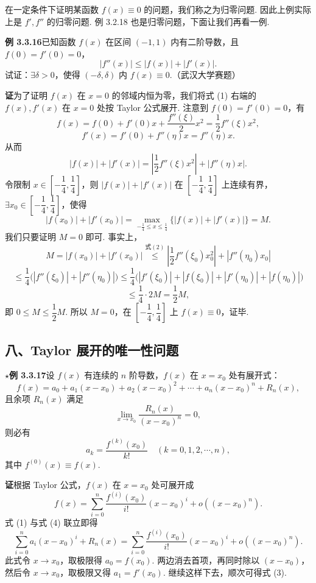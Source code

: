 \documentclass[UTF8,12pt,a4paper,fontset=fandol]{ctexart}
\begin{document}
在一定条件下证明某函数 $f(x)\equiv0$ 的问题，我们称之为归零问题. 因此上例实际上是 $f',f''$ 的归零问题. 例 3.2.18 也是归零问题，下面让我们再看一例.

\noindent\textbf{例 3.3.16}\quad 已知函数 $f(x)$ 在区间 $(-1,1)$ 内有二阶导数，且 $f(0)=f'(0)=0$，
\[
  |f''(x)|\le |f(x)|+|f'(x)|. \tag{1}
\]
试证：$\exists\delta>0$，使得 $(-\delta,\delta)$ 内 $f(x)\equiv0$.（武汉大学赛题）

\noindent\textbf{证}\quad 为了证明 $f(x)$ 在 $x=0$ 的邻域内恒为零，我们将式 (1) 右端的 $f(x),f'(x)$ 在 $x=0$ 处按 Taylor 公式展开. 注意到 $f(0)=f'(0)=0$，有
\[
  f(x)=f(0)+f'(0)x+\frac{f''(\xi)}2x^2=\frac12f''(\xi)x^2,
\]
\[
  f'(x)=f'(0)+f''(\eta)x=f''(\eta)x.
\]
从而
\[
  |f(x)|+|f'(x)|=\left|\frac12f''(\xi)x^2\right|+|f''(\eta)x|. \tag{2}
\]
令限制 $x\in\left[-\dfrac14,\dfrac14\right]$，则 $|f(x)|+|f'(x)|$ 在 $\left[-\dfrac14,\dfrac14\right]$ 上连续有界，$\exists x_0\in\left[-\dfrac14,\dfrac14\right]$，使得
\[
  |f(x_0)|+|f'(x_0)|=\max_{-\frac14\le x\le\frac14}\{|f(x)|+|f'(x)|\}=M.
\]
我们只要证明 $M=0$ 即可. 事实上，
\[
  M=|f(x_0)|+|f'(x_0)|
  \overset{\text{式}(2)}{\le}
  \left|\frac12f''(\xi_0)x_0^2\right|+|f''(\eta_0)x_0|
\]
\[
  \le \frac14\bigl(|f''(\xi_0)|+|f''(\eta_0)|\bigr)
  \le \frac14\bigl(|f'(\xi_0)|+|f(\xi_0)|+|f'(\eta_0)|+|f(\eta_0)|\bigr)
\]
\[
  \le \frac14\cdot2M=\frac12M,
\]
即 $0\le M\le\dfrac12M$. 所以 $M=0$，在 $\left[-\dfrac14,\dfrac14\right]$ 上 $f(x)\equiv0$，证毕.

\subsection*{八、Taylor 展开的唯一性问题}

\noindent\textbf{$\star$例 3.3.17}\quad 设 $f(x)$ 有连续的 $n$ 阶导数，$f(x)$ 在 $x=x_0$ 处有展开式：
\[
  f(x)=a_0+a_1(x-x_0)+a_2(x-x_0)^2+\cdots+a_n(x-x_0)^n+R_n(x), \tag{1}
\]
且余项 $R_n(x)$ 满足
\[
  \lim_{x\to x_0}\frac{R_n(x)}{(x-x_0)^n}=0, \tag{2}
\]
则必有
\[
  a_k=\frac{f^{(k)}(x_0)}{k!}\quad(k=0,1,2,\cdots,n), \tag{3}
\]
其中 $f^{(0)}(x)\equiv f(x)$.

\noindent\textbf{证}\quad 根据 Taylor 公式，$f(x)$ 在 $x=x_0$ 处可展开成
\[
  f(x)=\sum_{i=0}^n\frac{f^{(i)}(x_0)}{i!}(x-x_0)^i+o((x-x_0)^n). \tag{4}
\]
式 (1) 与式 (4) 联立即得
\[
  \sum_{i=0}^n a_i(x-x_0)^i+R_n(x)
  =\sum_{i=0}^n\frac{f^{(i)}(x_0)}{i!}(x-x_0)^i+o((x-x_0)^n).
\]
此式令 $x\to x_0$，取极限得 $a_0=f(x_0)$. 两边消去首项，再同时除以 $(x-x_0)$，然后令 $x\to x_0$，取极限又得 $a_1=f'(x_0)$. 继续这样下去，顺次可得式 (3).
\end{document}
